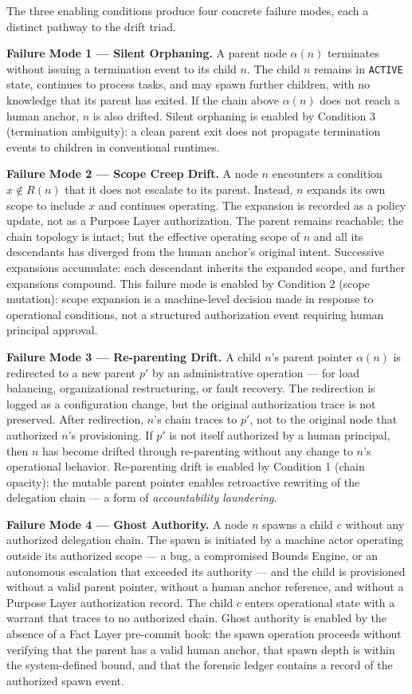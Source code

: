 The three enabling conditions produce four concrete failure modes, each a distinct pathway to the drift triad.

\medskip
\noindent\textbf{Failure Mode 1 — Silent Orphaning.}
A parent node $\alpha(n)$ terminates without issuing a termination event to its child $n$. The child $n$ remains in \texttt{ACTIVE} state, continues to process tasks, and may spawn further children, with no knowledge that its parent has exited. If the chain above $\alpha(n)$ does not reach a human anchor, $n$ is also drifted. Silent orphaning is enabled by Condition 3 (termination ambiguity): a clean parent exit does not propagate termination events to children in conventional runtimes.

\medskip
\noindent\textbf{Failure Mode 2 — Scope Creep Drift.}
A node $n$ encounters a condition $x \notin R(n)$ that it does not escalate to its parent. Instead, $n$ expands its own scope to include $x$ and continues operating. The expansion is recorded as a policy update, not as a Purpose Layer authorization. The parent remains reachable; the chain topology is intact; but the effective operating scope of $n$ and all its descendants has diverged from the human anchor's original intent. Successive expansions accumulate: each descendant inherits the expanded scope, and further expansions compound. This failure mode is enabled by Condition 2 (scope mutation): scope expansion is a machine-level decision made in response to operational conditions, not a structured authorization event requiring human principal approval.

\medskip
\noindent\textbf{Failure Mode 3 — Re-parenting Drift.}
A child $n$'s parent pointer $\alpha(n)$ is redirected to a new parent $p'$ by an administrative operation — for load balancing, organizational restructuring, or fault recovery. The redirection is logged as a configuration change, but the original authorization trace is not preserved. After redirection, $n$'s chain traces to $p'$, not to the original node that authorized $n$'s provisioning. If $p'$ is not itself authorized by a human principal, then $n$ has become drifted through re-parenting without any change to $n$'s operational behavior. Re-parenting drift is enabled by Condition 1 (chain opacity): the mutable parent pointer enables retroactive rewriting of the delegation chain — a form of \emph{accountability laundering}.

\medskip
\noindent\textbf{Failure Mode 4 — Ghost Authority.}
A node $n$ spawns a child $c$ without any authorized delegation chain. The spawn is initiated by a machine actor operating outside its authorized scope — a bug, a compromised Bounds Engine, or an autonomous escalation that exceeded its authority — and the child is provisioned without a valid parent pointer, without a human anchor reference, and without a Purpose Layer authorization record. The child $c$ enters operational state with a warrant that traces to no authorized chain. Ghost authority is enabled by the absence of a Fact Layer pre-commit hook: the spawn operation proceeds without verifying that the parent has a valid human anchor, that spawn depth is within the system-defined bound, and that the forensic ledger contains a record of the authorized spawn event.

